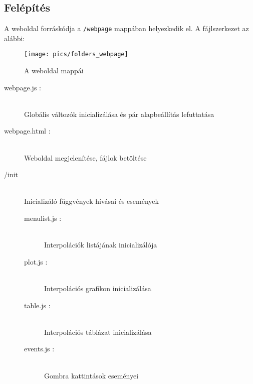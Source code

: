 \subsection{Felépítés}
	A weboldal forráskódja a \texttt{/webpage} mappában helyezkedik el. 
	A fájlszerkezet az alábbi:
	\begin{figure}[h]
		\texttt{[image: pics/folders\_webpage]}
		\centering
		\caption{A weboldal mappái\label{fig:folders_all}}
	\end{figure}
	\begin{description}
		\item[webpage.js :] \hfill \\  
		Globális változók inicializálása és pár alapbeállítás lefuttatása
		
		\item[webpage.html :]  \hfill \\ 
		Weboldal megjelenítése, fájlok betöltése
		
		\item[/init] \hfill \\ 
		Inicializáló függvények hívásai és események
		\begin{description}
			\item[menulist.js : ] \hfill \\ 
				Interpolációk listájának inicializálója
		  	\item[plot.js : ] \hfill \\ 
		  		Interpolációs grafikon inicializálása
			\item[table.js : ] \hfill \\ 
				Interpolációs táblázat inicializálása
		 	\item[events.js : ] \hfill \\ 
		 		Gombra kattintások eseményei
		\end{description}


\end{description}

